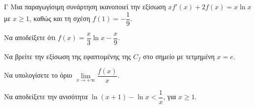 \begin{thema}{Γ}
Μια παραγωγίσιμη συνάρτηση ικανοποιεί την εξίσωση $x f'(x) + 2 f(x) = x \ln x$ με $x \ge 1$, καθώς και τη σχέση $f(1) = -\dfrac{1}{9}$.
\begin{erwthma}
  \item Να αποδείξετε ότι $f(x) = \dfrac{x}{3}\ln x - \dfrac{x}{9}$.
  \item Να βρείτε την εξίσωση της εφαπτομένης της $C_f$ στο σημείο με τετμημένη $x=e$.
  \item Να υπολογίσετε το όριο $\lim\limits_{x \to +\infty} \dfrac{f(x)}{x}$.
  \item Να αποδείξετε την ανισότητα $\ln(x+1) - \ln x < \dfrac{1}{x}$, για $x \ge 1$.
\end{erwthma}
\end{thema}
